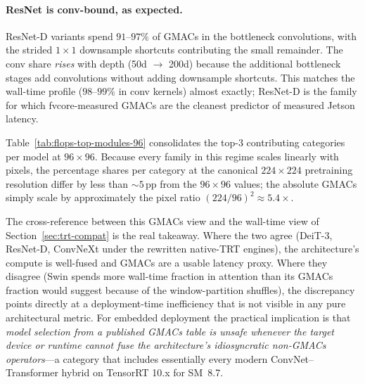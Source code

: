 \documentclass[runningheads,a4paper]{llncs}
\begin{document}
\paragraph{ResNet is conv-bound, as expected.}
ResNet-D variants spend $91$--$97\%$ of GMACs in the bottleneck convolutions, with the strided $1\times1$ downsample shortcuts contributing the small remainder. The conv share \emph{rises} with depth (50d $\to$ 200d) because the additional bottleneck stages add convolutions without adding downsample shortcuts. This matches the wall-time profile ($98$--$99\%$ in conv kernels) almost exactly; ResNet-D is the family for which fvcore-measured GMACs are the cleanest predictor of measured Jetson latency.

Table~\ref{tab:flops-top-modules-96} consolidates the top-3 contributing categories per model at $96\times96$. Because every family in this regime scales linearly with pixels, the percentage shares per category at the canonical $224\times224$ pretraining resolution differ by less than $\sim$$5$\,pp from the $96\times96$ values; the absolute GMACs simply scale by approximately the pixel ratio $(224/96)^2 \approx 5.4\times$.

\begin{table}[!htbp]
    \centering
    \caption{Top-3 per-module GMACs contributors at the $96\times96$ TinyFace deployment resolution. ``GMACs'' is the total backbone cost at batch=1; percentages give each category's share of that total. ``FFN / MLP'' includes the inverted-bottleneck $1\times1$ projection stack for ConvNeXt; ``Attn other'' for PVT v2 captures the spatial-reduction projections inside the attention block.}
    \label{tab:flops-top-modules-96}
    \scriptsize
    
\end{table}

The cross-reference between this GMACs view and the wall-time view of Section~\ref{sec:trt-compat} is the real takeaway. Where the two agree (DeiT-3, ResNet-D, ConvNeXt under the rewritten native-TRT engines), the architecture's compute is well-fused and GMACs are a usable latency proxy. Where they disagree (Swin spends more wall-time fraction in attention than its GMACs fraction would suggest because of the window-partition shuffles), the discrepancy points directly at a deployment-time inefficiency that is not visible in any pure architectural metric. For embedded deployment the practical implication is that \emph{model selection from a published GMACs table is unsafe whenever the target device or runtime cannot fuse the architecture's idiosyncratic non-GMACs operators}---a category that includes essentially every modern ConvNet--Transformer hybrid on TensorRT 10.x for SM~8.7.
\end{document}
